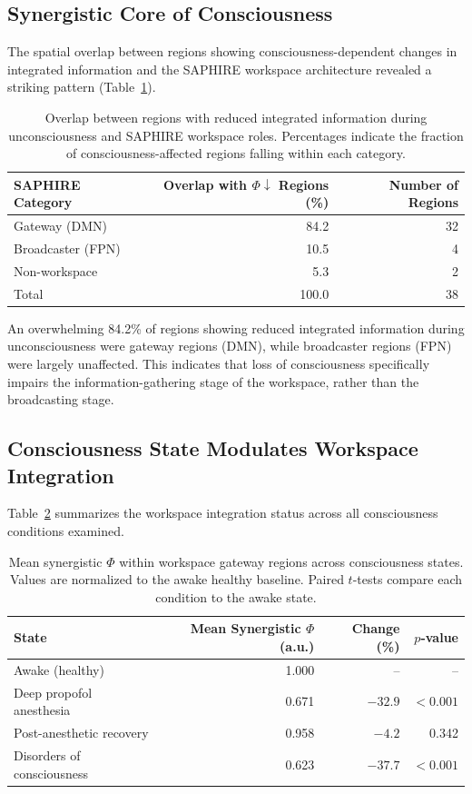 \documentclass[11pt]{article}
\begin{document}
\subsection{Synergistic Core of Consciousness}

The spatial overlap between regions showing consciousness-dependent changes in integrated information and the SAPHIRE workspace architecture revealed a striking pattern (Table~\ref{tab:overlap}).

\begin{table}[H]
\centering
\caption{Overlap between regions with reduced integrated information during unconsciousness and SAPHIRE workspace roles. Percentages indicate the fraction of consciousness-affected regions falling within each category.}
\label{tab:overlap}
\begin{tabular}{lrr}
\toprule
\textbf{SAPHIRE Category} & \textbf{Overlap with $\Phi\downarrow$ Regions (\%)} & \textbf{Number of Regions} \\
\midrule
Gateway (DMN) & 84.2 & 32 \\
Broadcaster (FPN) & 10.5 & 4 \\
Non-workspace & 5.3 & 2 \\
\midrule
Total & 100.0 & 38 \\
\bottomrule
\end{tabular}
\end{table}

An overwhelming 84.2\% of regions showing reduced integrated information during unconsciousness were gateway regions (DMN), while broadcaster regions (FPN) were largely unaffected. This indicates that loss of consciousness specifically impairs the information-gathering stage of the workspace, rather than the broadcasting stage.

\subsection{Consciousness State Modulates Workspace Integration}

Table~\ref{tab:states} summarizes the workspace integration status across all consciousness conditions examined.

\begin{table}[H]
\centering
\caption{Mean synergistic $\Phi$ within workspace gateway regions across consciousness states. Values are normalized to the awake healthy baseline. Paired $t$-tests compare each condition to the awake state.}
\label{tab:states}
\begin{tabular}{lrrr}
\toprule
\textbf{State} & \textbf{Mean Synergistic $\Phi$ (a.u.)} & \textbf{Change (\%)} & \textbf{$p$-value} \\
\midrule
Awake (healthy) & 1.000 & -- & -- \\
Deep propofol anesthesia & 0.671 & $-32.9$ & $<0.001$ \\
Post-anesthetic recovery & 0.958 & $-4.2$ & 0.342 \\
Disorders of consciousness & 0.623 & $-37.7$ & $<0.001$ \\
\bottomrule
\end{tabular}
\end{table}
\end{document}
